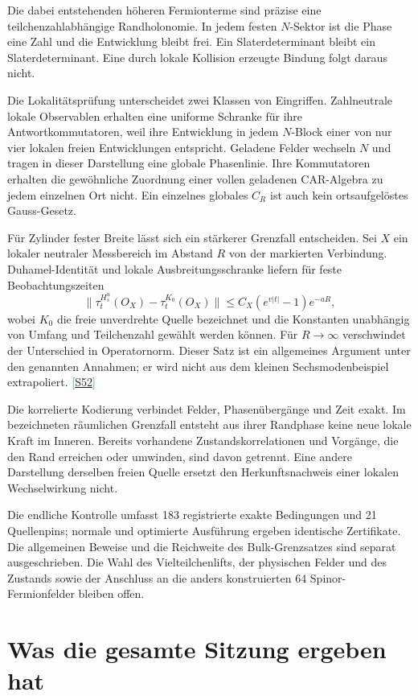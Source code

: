 \documentclass[11pt,a4paper,oneside,parskip=half,headings=normal,numbers=noenddot,bibliography=totoc]{scrreprt}
\newcommand{\src}[1]{\textcolor{teal}{\small[\hyperref[s:#1]{S#1}]}}
\newcommand{\finding}[2]{\begin{tcolorbox}[enhanced,breakable,colback=pale,colframe=teal,boxrule=0pt,borderline west={2pt}{0pt}{teal},arc=0mm,left=3mm,right=3mm,top=2mm,bottom=2mm,title={#1},coltitle=ink,colbacktitle=pale,fonttitle=\sffamily\bfseries]#2\end{tcolorbox}}
\begin{document}
Die dabei entstehenden höheren Fermionterme sind präzise eine teilchenzahlabhängige Randholonomie. In jedem festen $N$-Sektor ist die Phase eine Zahl und die Entwicklung bleibt frei. Ein Slaterdeterminant bleibt ein Slaterdeterminant. Eine durch lokale Kollision erzeugte Bindung folgt daraus nicht.

Die Lokalitätsprüfung unterscheidet zwei Klassen von Eingriffen. Zahlneutrale lokale Observablen erhalten eine uniforme Schranke für ihre Antwortkommutatoren, weil ihre Entwicklung in jedem $N$-Block einer von nur vier lokalen freien Entwicklungen entspricht. Geladene Felder wechseln $N$ und tragen in dieser Darstellung eine globale Phasenlinie. Ihre Kommutatoren erhalten die gewöhnliche Zuordnung einer vollen geladenen CAR-Algebra zu jedem einzelnen Ort nicht. Ein einzelnes globales $C_R$ ist auch kein ortsaufgelöstes Gauss-Gesetz.

Für Zylinder fester Breite lässt sich ein stärkerer Grenzfall entscheiden. Sei $X$ ein lokaler neutraler Messbereich im Abstand $R$ von der markierten Verbindung. Duhamel-Identität und lokale Ausbreitungsschranke liefern für feste Beobachtungszeiten
\[
 \|\tau_t^{H_s^u}(O_X)-\tau_t^{K_0}(O_X)\|
 \le C_X(e^{v|t|}-1)e^{-aR},
\]
wobei $K_0$ die freie unverdrehte Quelle bezeichnet und die Konstanten unabhängig von Umfang und Teilchenzahl gewählt werden können. Für $R\to\infty$ verschwindet der Unterschied in Operatornorm. Dieser Satz ist ein allgemeines Argument unter den genannten Annahmen; er wird nicht aus dem kleinen Sechsmodenbeispiel extrapoliert. \src{52}

\finding{Was damit entschieden ist}{Die korrelierte Kodierung verbindet Felder, Phasenübergänge und Zeit exakt. Im bezeichneten räumlichen Grenzfall entsteht aus ihrer Randphase keine neue lokale Kraft im Inneren. Bereits vorhandene Zustandskorrelationen und Vorgänge, die den Rand erreichen oder umwinden, sind davon getrennt. Eine andere Darstellung derselben freien Quelle ersetzt den Herkunftsnachweis einer lokalen Wechselwirkung nicht.}

Die endliche Kontrolle umfasst 183 registrierte exakte Bedingungen und 21 Quellenpins; normale und optimierte Ausführung ergeben identische Zertifikate. Die allgemeinen Beweise und die Reichweite des Bulk-Grenzsatzes sind separat ausgeschrieben. Die Wahl des Vielteilchenlifts, der physischen Felder und des Zustands sowie der Anschluss an die anders konstruierten 64 Spinor-Fermionfelder bleiben offen.

\chapter{Was die gesamte Sitzung ergeben hat}
\end{document}

